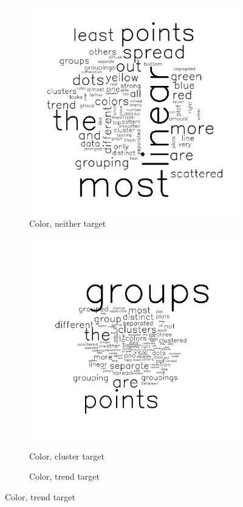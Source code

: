 \documentclass[11pt]{isuthesis}\usepackage[]{graphicx}\usepackage[]{color}
\begin{document}
\begin{figure}[ht]
\begin{subfigure}[t]{0.32\linewidth}\centering
  \caption{Color, neither target}
  \includegraphics[width=.75\linewidth]{fig-sentiment-7}
\end{subfigure}
\begin{subfigure}[t]{0.32\linewidth}\centering
  \caption{Color, cluster target}
  \includegraphics[width=.75\linewidth]{fig-sentiment-8}
\end{subfigure}
\begin{subfigure}[t]{0.32\linewidth}\centering
  \caption{Color, trend target}

\end{subfigure}
\end{figure}
\end{document}
